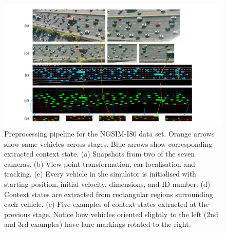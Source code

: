 \documentclass{article} %
\begin{document}
\begin{figure}
  \centering
  \includegraphics[width=\textwidth]{figures/driving/I-80.pdf}
  \caption{
    Preprocessing pipeline for the NGSIM-I80 data set.
    Orange arrows show same vehicles across stages.
    Blue arrows show corresponding extracted context state.
    (a) Snapshots from two of the seven cameras.
    (b) View point transformation, car localisation and tracking.
    (c) Every vehicle in the simulator is initialised with starting position, initial velocity, dimensions, and ID number.
    (d) Context states are extracted from rectangular regions surrounding each vehicle.
    (e) Five examples of context states extracted at the previous stage.
    Notice how vehicles oriented slightly to the left (2nd and 3rd examples) have lane markings rotated to the right.
  }
\label{I-80}
\end{figure}
\end{document}
